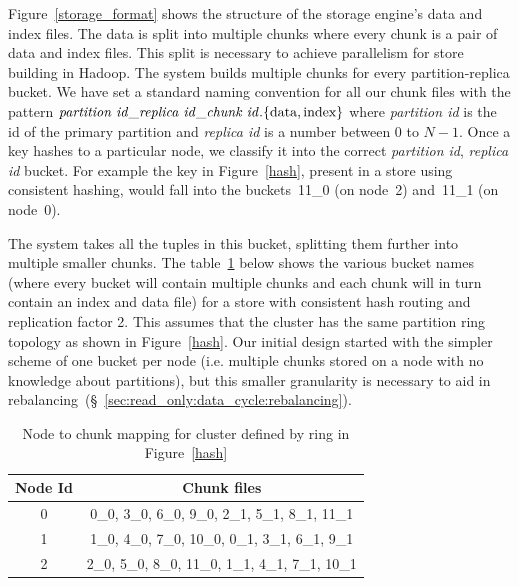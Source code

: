 Figure~\ref{storage_format} shows the structure of the storage
engine's data and index files. The data is split into multiple chunks 
where every chunk is a pair of data and index files. This split is 
necessary to achieve parallelism for store building in Hadoop. The 
system builds multiple chunks for every partition-replica bucket. 
We have set a standard naming convention for all our chunk files with 
the pattern
$\text{\emph{partition id}}\_\text{\emph{replica
id}}\_\text{\emph{chunk id}}.\{\text{data},\text{index}\}$ where
\emph{partition id} is the id of the primary partition and
\emph{replica id} is a number between 0 to $N-1$. Once a key hashes to
a particular node, we classify it into the correct \emph{partition
id}, \emph{replica id} bucket. For example the key in
Figure~\ref{hash}, present in a store using consistent hashing, would
fall into the buckets~11\_0 (on node~2) and~11\_1 (on node~0). 

The system takes all the tuples in this bucket, splitting them further
into multiple smaller chunks. The table~\ref{tab:node_to_chunk} below
shows the various bucket names (where every bucket will contain
multiple chunks and each chunk will in turn contain an index and data
file) for a store with consistent hash routing and replication factor
2. This assumes that the cluster has the same partition ring topology
as shown in Figure~\ref{hash}. Our initial design started with the
simpler scheme of one bucket per node (i.e. multiple chunks stored on
a node with no knowledge about partitions), but this smaller
granularity is necessary to aid in
rebalancing~(\S~\ref{sec:read_only:data_cycle:rebalancing}).

\begin{table}
\begin{center}
    \begin{tabular}{ | c | c | }
    \hline
    Node Id & Chunk files \\ \hline
    0 &  0\_0, 3\_0, 6\_0, 9\_0,      2\_1, 5\_1, 8\_1, 11\_1	\\
   1 &   1\_0, 4\_0, 7\_0, 10\_0,      0\_1, 3\_1, 6\_1, 9\_1		\\
   2 &    2\_0, 5\_0, 8\_0, 11\_0,    1\_1, 4\_1, 7\_1, 10\_1		\\
\hline
    \end{tabular}
\end{center}
 	\caption{Node to chunk mapping for cluster defined by ring in Figure~\ref{hash}}
 	\label{tab:node_to_chunk}
\end{table}

